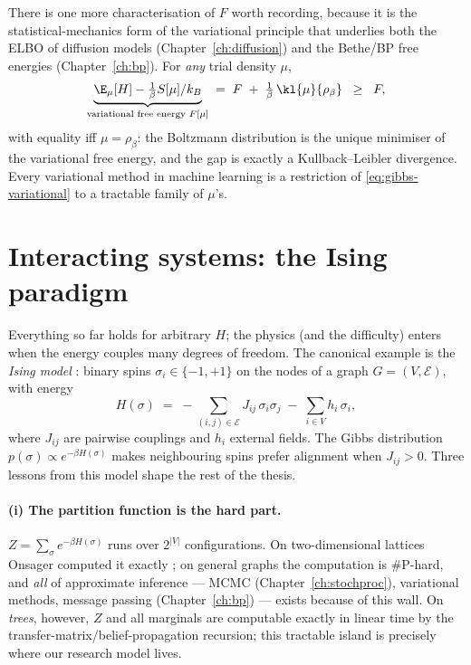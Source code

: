 There is one more characterisation of $F$ worth recording, because it is the
statistical-mechanics form of the variational principle that underlies both
the ELBO of diffusion models (Chapter~\ref{ch:diffusion}) and the
Bethe/BP free energies (Chapter~\ref{ch:bp}). For \emph{any} trial density
$\mu$,
\begin{equation}
  \underbrace{\E_\mu[H] - \tfrac{1}{\beta} S[\mu]/k_B}_{\text{variational free energy } F[\mu]}
  \;=\; F \;+\; \tfrac{1}{\beta}\, \kl{\mu}{\rho_\beta}
  \;\;\geq\;\; F ,
  \label{eq:gibbs-variational}
\end{equation}
with equality iff $\mu = \rho_\beta$: the Boltzmann distribution is the
unique minimiser of the variational free energy, and the gap is exactly a
Kullback--Leibler divergence. Every variational method in machine learning is
a restriction of \eqref{eq:gibbs-variational} to a tractable family of
$\mu$'s.

\section{Interacting systems: the Ising paradigm}\label{sec:ising}

Everything so far holds for arbitrary $H$; the physics (and the difficulty)
enters when the energy couples many degrees of freedom. The canonical example
is the \emph{Ising model} \citep{ising1925beitrag}: binary spins
$\sigma_i \in \{-1, +1\}$ on the nodes of a graph $G = (V, \mathcal{E})$, with
energy
\begin{equation}
  H(\sigma) \;=\; -\sum_{(i,j) \in \mathcal{E}} J_{ij}\, \sigma_i \sigma_j
  \;-\; \sum_{i \in V} h_i\, \sigma_i ,
  \label{eq:ising}
\end{equation}
where $J_{ij}$ are pairwise couplings and $h_i$ external fields. The Gibbs
distribution $p(\sigma) \propto e^{-\beta H(\sigma)}$ makes neighbouring
spins prefer alignment when $J_{ij} > 0$. Three lessons from this model
shape the rest of the thesis.

\paragraph{(i) The partition function is the hard part.} $Z = \sum_\sigma
e^{-\beta H(\sigma)}$ runs over $2^{|V|}$ configurations. On two-dimensional
lattices Onsager computed it exactly \citep{onsager1944crystal}; on general
graphs the computation is \#P-hard, and \emph{all} of approximate inference
--- MCMC (Chapter~\ref{ch:stochproc}), variational methods, message passing
(Chapter~\ref{ch:bp}) --- exists because of this wall. On \emph{trees},
however, $Z$ and all marginals are computable exactly in linear time by the
transfer-matrix/belief-propagation recursion; this tractable island is
precisely where our research model lives.

